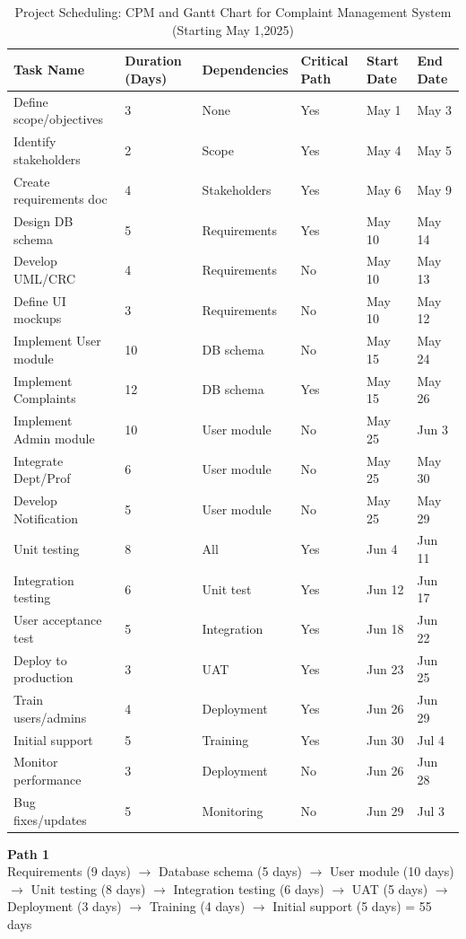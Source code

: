 \documentclass[a4paper,12pt]{article}
\begin{document}
\begin{table}[h]
\centering
\scriptsize %
\begin{tabular}{|>{\raggedright\arraybackslash}m{4.0cm}|C{1.3cm}|C{2.0cm}|C{1.1cm}|C{1.0cm}|C{1.0cm}|}
\hline
\textbf{Task Name} & \textbf{Duration (Days)} & \textbf{Dependencies} & \textbf{Critical Path} & \textbf{Start Date } & \textbf{End Date} \\
\hline
Define scope/objectives & 3 & None & Yes & May 1 & May 3 \\
Identify stakeholders & 2 & Scope & Yes & May 4 & May 5 \\
Create requirements doc & 4 & Stakeholders & Yes & May 6 & May 9 \\
Design DB schema & 5 & Requirements & Yes & May 10 & May 14 \\
Develop UML/CRC & 4 & Requirements & No & May 10 & May 13 \\
Define UI mockups & 3 & Requirements & No & May 10 & May 12 \\
Implement User module & 10 & DB schema & No & May 15 & May 24 \\
Implement Complaints & 12 & DB schema & Yes & May 15 & May 26 \\
Implement Admin module & 10 & User module & No & May 25 & Jun 3 \\
Integrate Dept/Prof & 6 & User module & No & May 25 & May 30 \\
Develop Notification & 5 & User module & No & May 25 & May 29 \\
Unit testing & 8 & All & Yes & Jun 4 & Jun 11 \\
Integration testing & 6 & Unit test & Yes & Jun 12 & Jun 17 \\
User acceptance test & 5 & Integration & Yes & Jun 18 & Jun 22 \\
Deploy to production & 3 & UAT & Yes & Jun 23 & Jun 25 \\
Train users/admins & 4 & Deployment & Yes & Jun 26 & Jun 29 \\
Initial support & 5 & Training & Yes & Jun 30 & Jul 4 \\
Monitor performance & 3 & Deployment & No & Jun 26 & Jun 28 \\
Bug fixes/updates & 5 & Monitoring & No & Jun 29 & Jul 3 \\
\hline
\end{tabular}
\caption{Project Scheduling: CPM and Gantt Chart for Complaint Management System (Starting May 1,2025)}
\label{tab:project-schedule}
\end{table}
\textbf{Path 1} \\
 Requirements (9 days) $\rightarrow$ Database schema (5 days) $\rightarrow$ User module (10 days) $\rightarrow$ Unit testing (8 days) $\rightarrow$ Integration testing (6 days) $\rightarrow$ UAT (5 days) $\rightarrow$ Deployment (3 days) $\rightarrow$ Training (4 days) $\rightarrow$ Initial support (5 days) = 55 days
\end{document}
